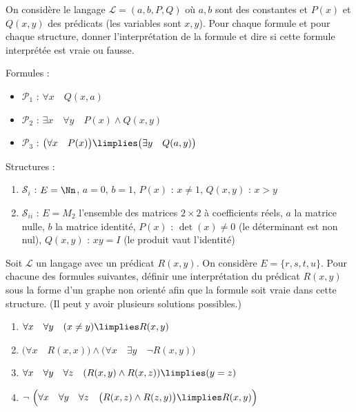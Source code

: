 \documentclass[11pt,class=report,crop=false]{standalone}
\begin{document}
\begin{exercicecours}
	On considère le langage $\mathcal{L} = (a,b,P,Q)$ où $a,b$ sont des constantes et $P(x)$ et $Q(x,y)$ des prédicats (les variables sont $x,y$).
	Pour chaque formule et pour chaque structure, donner l'interprétation de la formule et dire si cette formule interprétée est vraie ou fausse.
	
Formules :
\begin{itemize}
	\item $\mathcal{P}_1$ : $\forall x \quad Q(x,a)$
	
	\item $\mathcal{P}_2$ : $\exists x \quad \forall y \quad P(x) \land Q(x,y)$
	
	\item $\mathcal{P}_3$ : $\big(\forall x \quad P(x)\big) \limplies \big(\exists y \quad Q(a,y)\big)$
\end{itemize}

Structures :
\begin{enumerate}
	\item $\mathcal{S}_i$ : $E=\Nn$, $a=0$, $b=1$, $P(x)$ : \og{}$x \neq 1$\fg{}, $Q(x,y)$ : \og{}$x > y$\fg{}
	
	\item $\mathcal{S}_{ii}$ : $E=M_2$ l'ensemble des matrices $2 \times 2$ à coefficients réels, $a$ la matrice nulle, $b$ la matrice identité, $P(x)$ : \og{}$\det(x) \neq 0$\fg{} (le déterminant est non nul), $Q(x,y)$ : \og{}$xy = I$\fg{} (le produit vaut l'identité)	
\end{enumerate}	
\end{exercicecours}


\begin{exercicecours}
Soit $\mathcal{L}$ un langage avec un prédicat $R(x,y)$.
On considère $E = \{r, s, t, u\}$.
Pour chacune des formules suivantes, définir une interprétation du prédicat $R(x,y)$ sous la forme d'un graphe non orienté afin que la formule soit vraie dans cette structure. (Il peut y avoir plusieurs solutions possibles.)
\begin{enumerate}
	\item $\forall x \quad \forall y \quad (x \neq y) \limplies R(x,y)$
	
	\item $\big(\forall x \quad R(x,x) \big) \land \big(\forall x \quad \exists y \quad \lnot R(x,y) \big)$
	
	\item $\forall x \quad \forall y \quad \forall z \quad (R(x,y) \land R(x,z)) \limplies (y=z)$
	
	\item $\lnot \ \Big( \forall x \quad \forall y \quad \forall z \quad \big( R(x,z) \land R(z,y) \big) \limplies R(x,y) \Big)$
\end{enumerate}
\end{exercicecours}
\end{document}
